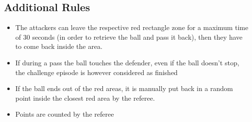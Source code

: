 \subsection{Additional Rules}
\begin{itemize}
    \item The attackers can leave the respective red rectangle zone for a maximum time of 30 seconds (in order to retrieve the ball and pass it back), then they have to come back inside the area.
    \item If during a pass the ball touches the defender, even if the ball doesn't stop, the challenge episode is however considered as finished
    \item If the ball ends out of the red areas, it is manually put back in a random point inside the closest red area by the referee.
    \item Points are counted by the referee
    
\end{itemize}
